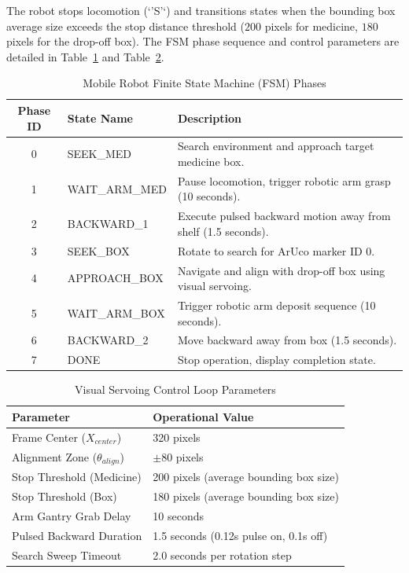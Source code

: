 \documentclass[12pt,a4paper,oneside]{report}
\begin{document}
The robot stops locomotion (`'S'`) and transitions states when the bounding box average size exceeds the stop distance threshold ($200$ pixels for medicine, $180$ pixels for the drop-off box). The FSM phase sequence and control parameters are detailed in Table~\ref{tab:table15} and Table~\ref{tab:table16}.

\begin{table}[htbp]
\centering
\caption{Mobile Robot Finite State Machine (FSM) Phases}
\label{tab:table15}
\begin{tabular}{c l p{8.5cm}}
\toprule
\textbf{Phase ID} & \textbf{State Name} & \textbf{Description} \\
\midrule
0 & SEEK\_MED      & Search environment and approach target medicine box. \\
1 & WAIT\_ARM\_MED  & Pause locomotion, trigger robotic arm grasp (10 seconds). \\
2 & BACKWARD\_1    & Execute pulsed backward motion away from shelf (1.5 seconds). \\
3 & SEEK\_BOX      & Rotate to search for ArUco marker ID 0. \\
4 & APPROACH\_BOX  & Navigate and align with drop-off box using visual servoing. \\
5 & WAIT\_ARM\_BOX  & Trigger robotic arm deposit sequence (10 seconds). \\
6 & BACKWARD\_2    & Move backward away from box (1.5 seconds). \\
7 & DONE           & Stop operation, display completion state. \\
\bottomrule
\end{tabular}
\end{table}

\begin{table}[htbp]
\centering
\caption{Visual Servoing Control Loop Parameters\label{tab:table16}}
\begin{tabular}{ll}
\toprule
\textbf{Parameter} & \textbf{Operational Value} \\
\midrule
Frame Center ($X_{center}$) & 320 pixels \\
Alignment Zone ($\theta_{align}$) & $\pm 80$ pixels \\
Stop Threshold (Medicine) & 200 pixels (average bounding box size) \\
Stop Threshold (Box) & 180 pixels (average bounding box size) \\
Arm Gantry Grab Delay & 10 seconds \\
Pulsed Backward Duration & 1.5 seconds (0.12s pulse on, 0.1s off) \\
Search Sweep Timeout & 2.0 seconds per rotation step \\
\bottomrule
\end{tabular}
\end{table}
\end{document}
